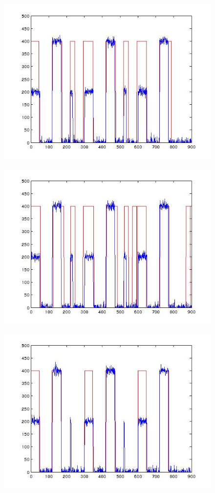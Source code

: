 \documentclass{article}
\begin{document}
\begin{figure}[h]
\centering
\includegraphics[height = 7.3 cm]{time_freq_model.jpg}
\caption{}
\label{fig:hvb}
\end{figure}

\begin{figure}[h]
\centering
\includegraphics[height = 7.3 cm]{time_freq_1.jpg}
\caption{}
\label{fig:hvb}
\end{figure}

\begin{figure}[h]
\centering
\includegraphics[height = 7.3 cm]{time_freq_missing.jpg}
\caption{}
\label{fig:hvb}
\end{figure}



\end{document}
